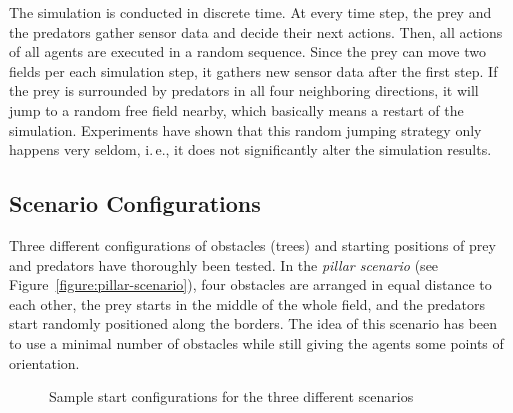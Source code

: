 The simulation is conducted in discrete time. At every time step, the prey and the predators gather sensor data and decide their next actions. Then, all actions of all agents are executed in a random sequence. Since the prey can move two fields per each simulation step, it gathers new sensor data after the first step. If the prey is surrounded by predators in all four neighboring directions, it will jump to a random free field nearby, which basically means a restart of the simulation. Experiments have shown that this random jumping strategy only happens very seldom, i.\,e., it does not significantly alter the simulation results.

\subsection{Scenario Configurations}
\label{subsection:scenario-obstacle}

Three different configurations of obstacles (trees) and star\-ting positions of prey and predators have thoroughly been tested. In the \emph{pillar scenario} (see Figure~\ref{figure:pillar-scenario}), four obstacles are arranged in equal distance to each other, the prey starts in the middle of the whole field, and the predators start randomly positioned along the borders. The idea of this scenario has been to use a minimal number of obstacles while still giving the agents some points of orientation.

\begin{figure}[ht]
	\hfill
  \hfill
  \caption{Sample start configurations for the three different scenarios}
  \label{figure:scenarios}
\end{figure}

